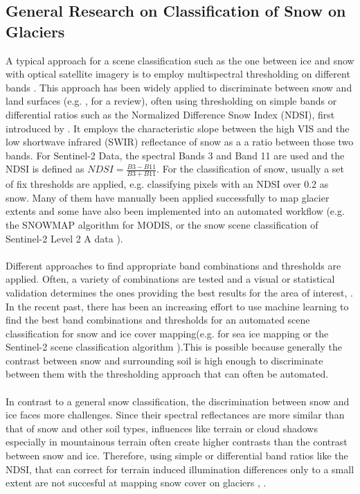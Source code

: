 \documentclass[12pt]{article}
\begin{document}
\subsection{General Research on Classification of Snow on Glaciers}
A typical approach for a scene classification such as the one between ice and snow with optical satellite imagery is to employ multispectral thresholding on different bands \cite{Schowengerdt2012}. This approach has been widely applied to discriminate between snow and land surfaces (e.g. \cite{Paul2016}, \cite{Koenig2001} for a review), often using thresholding on simple bands or differential ratios such as the Normalized Difference Snow Index (NDSI), first introduced by \cite{Hall1995}. It employs the characteristic slope between the high VIS and the low shortwave infrared (SWIR) reflectance of snow as a a ratio between those two bands. For Sentinel-2 Data, the spectral Bands 3 and Band 11 are used and the NDSI is defined as $NDSI = \frac{B3-B11}{B3+B11}$.  For the classification of snow, usually a set of fix thresholds are applied, e.g. classifying pixels with an NDSI over 0.2 as snow. 
Many of them have manually been applied successfully to map glacier extents \cite{Paul2016} and some have also been implemented into an automated workflow (e.g. the SNOWMAP algorithm for MODIS, \cite{Hall1995} or the snow scene classification of Sentinel-2 Level 2 A data \cite{SentinelHandbook2015}).\\
 \\
Different approaches to find appropriate band combinations and thresholds are applied. Often, a variety of combinations are tested and a visual or statistical validation determines the ones providing the best results for the area of interest\cite{Rabatel2012}, \cite{Paul2016}. In the recent past, there has been an increasing effort to use machine learning to find the best band combinations and thresholds for an automated scene classification for snow and ice cover mapping(e.g. \cite{Bonev2017} for sea ice mapping or the Sentinel-2 scene classification algorithm \cite{SentinelHandbook2015}).This is possible because generally the contrast between snow and surrounding soil is high enough to discriminate between them with the thresholding approach that can often be automated.\\
\\
In contrast to a general snow classification, the discrimination between snow and ice faces more challenges. Since their spectral reflectances are more similar than that of snow and other soil types, influences like terrain or cloud shadows especially in mountainous terrain often create higher contrasts than the contrast between snow and ice. Therefore, using simple or differential band ratios like the NDSI, that can correct for terrain induced illumination differences only to a small extent are not succesful at mapping snow cover on glaciers \cite{Khan2015}, \cite{Paul2016}.  \\
\end{document}
